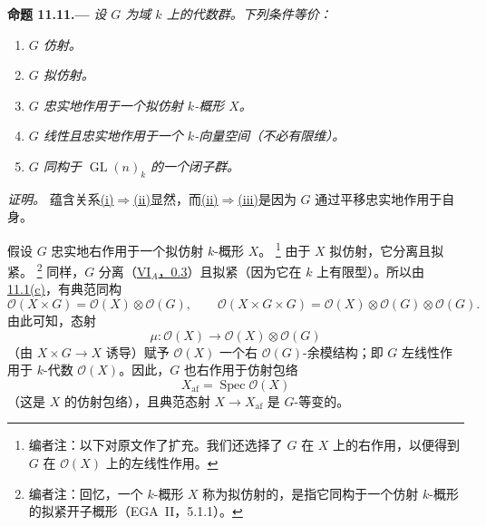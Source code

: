 \medskip
{}\label{prop:sga3-VIB-11.11}%
\noindent\textbf{命题 11.11.---}
\emph{设 \(G\) 为域 \(k\) 上的代数群。下列条件等价：}
\begin{enumerate}
\item[\textup{(i)}]\label{concl:sga3-VIB-11.11-i}
  \emph{\(G\) 仿射。}
\item[\textup{(ii)}]\label{concl:sga3-VIB-11.11-ii}
  \emph{\(G\) 拟仿射。}
\item[\textup{(iii)}]\label{concl:sga3-VIB-11.11-iii}
  \emph{\(G\) 忠实地作用于一个拟仿射 \(k\)-概形 \(X\)。}
\item[\textup{(iv)}]\label{concl:sga3-VIB-11.11-iv}
  \emph{\(G\) 线性且忠实地作用于一个 \(k\)-向量空间\textup{（不必有限维）}。}
\item[\textup{(v)}]\label{concl:sga3-VIB-11.11-v}
  \emph{\(G\) 同构于 \(\operatorname{GL}(n)_k\) 的一个闭子群。}
\end{enumerate}

\emph{证明。}
蕴含关系\hyperref[concl:sga3-VIB-11.11-i]{\textup{(i)}}\(\Rightarrow\)\hyperref[concl:sga3-VIB-11.11-ii]{\textup{(ii)}}显然，而\hyperref[concl:sga3-VIB-11.11-ii]{\textup{(ii)}}\(\Rightarrow\)\hyperref[concl:sga3-VIB-11.11-iii]{\textup{(iii)}}是因为 \(G\) 通过平移忠实地作用于自身。

假设 \(G\) 忠实地右作用于一个拟仿射 \(k\)-概形 \(X\)。%
\footnote{\label{note:sga3-VIB-121}编者注：以下对原文作了扩充。我们还选择了 \(G\) 在 \(X\) 上的右作用，以便得到 \(G\) 在 \(\mathcal O(X)\) 上的左线性作用。}
由于 \(X\) 拟仿射，它分离且拟紧。%
\footnote{\label{note:sga3-VIB-122}编者注：回忆，一个 \(k\)-概形 \(X\) 称为拟仿射的，是指它同构于一个仿射 \(k\)-概形的拟紧开子概形\textup{（EGA~II，5.1.1）}。}
同样，\(G\) 分离\textup{（\hyperref[sga3:VIA:0.3]{VI\(_A\)，0.3}）}且拟紧\textup{（因为它在 \(k\) 上有限型）}。所以由\hyperref[concl:sga3-VIB-11.1-c]{11.1\textup{(c)}}，有典范同构
\label{form:sga3-VIB-11.11-functions-products}%
\[
  \mathcal O(X\times G)
    =\mathcal O(X)\otimes\mathcal O(G),
  \qquad
  \mathcal O(X\times G\times G)
    =\mathcal O(X)\otimes\mathcal O(G)\otimes\mathcal O(G).
\]
由此可知，态射
\[
  \mu:\mathcal O(X)\longrightarrow
    \mathcal O(X)\otimes\mathcal O(G)
\]
（由 \(X\times G\to X\) 诱导）赋予 \(\mathcal O(X)\) 一个右 \(\mathcal O(G)\)-余模结构；即 \(G\) 左线性作用于 \(k\)-代数 \(\mathcal O(X)\)。因此，\(G\) 也右作用于仿射包络
\[
  X_{\mathrm{af}}=\operatorname{Spec}\mathcal O(X)
\]
（这是 \(X\) 的仿射包络），且典范态射 \(X\to X_{\mathrm{af}}\) 是 \(G\)-等变的。


